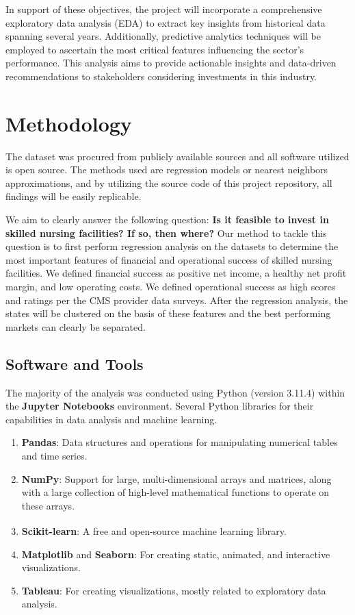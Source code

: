 \documentclass{article}
\theoremstyle{mytheoremstyle}
\theoremstyle{mytheoremstyle}
\theoremstyle{myproblemstyle}
\begin{document}
In support of these objectives, the project will incorporate a comprehensive exploratory data analysis (EDA) to extract key insights from historical data spanning several years. Additionally, predictive analytics techniques will be employed to ascertain the most critical features influencing the sector’s performance. This analysis aims to provide actionable insights and data-driven recommendations to stakeholders considering investments in this industry.

\pagebreak
\section{Methodology}

The dataset was procured from publicly available sources and all software utilized is open source. The methods used are regression models or nearest neighbors approximations, and by utilizing the source code of this project repository, all findings will be easily replicable.

We aim to clearly answer the following question: \textbf{Is it feasible to invest in skilled nursing facilities? If so, then where?} Our method to tackle this question is to first perform regression analysis on the datasets to determine the most important features of financial and operational success of skilled nursing facilities. We defined financial success as positive net income, a healthy net profit margin, and low operating costs. We defined operational success as high scores and ratings per the CMS provider data surveys. After the regression analysis, the states will be clustered on the basis of these features and the best performing markets can clearly be separated. 


\subsection{Software and Tools}

The majority of the analysis was conducted using Python (version 3.11.4) within the \textbf{Jupyter Notebooks} environment. Several Python libraries for their capabilities in data analysis and machine learning. 

\begin{enumerate}
    \item \textbf{Pandas}: Data structures and operations for manipulating numerical tables and time series.
    \item \textbf{NumPy}: Support for large, multi-dimensional arrays and matrices, along with a large collection of high-level mathematical functions to operate on these arrays.
    \item \textbf{Scikit-learn}: A free and open-source machine learning library.\textsuperscript{\cite{sklearn}} 
    \item \textbf{Matplotlib} and \textbf{Seaborn}: For creating static, animated, and interactive visualizations.
    \item \textbf{Tableau}: For creating visualizations, mostly related to exploratory data analysis.
\end{enumerate}
\end{document}
